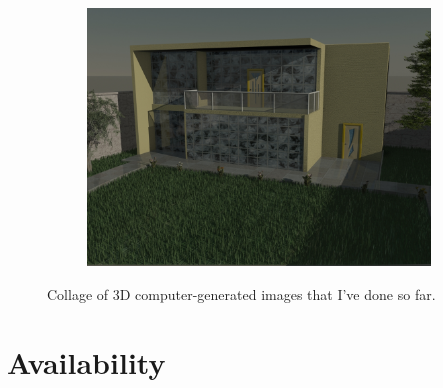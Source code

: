 \documentclass[11pt,a4paper]{report}
\begin{document}
\begin{figure}[H]
 \begin{subfigure}{0.47\textwidth}
 \centering
  \includegraphics[width=\textwidth]{images/house2}
 \end{subfigure}
 
 
 
 \caption{Collage of 3D computer-generated images that I've done so far.}
\end{figure}




\section*{Availability}
\end{document}
